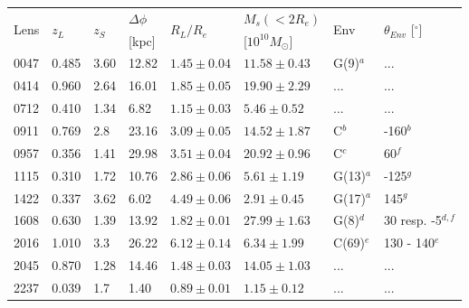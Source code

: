 \documentclass[useAMS,usenatbib]{mn2e}
\begin{document}
\begin{table}
  \begin{center}
    \begin{tabular}{l l l l l l l l}
      \multirow{2}{*}{Lens} & \multirow{2}{*}{$z_{L}$} & \multirow{2}{*}{$z_{S}$} & $\Delta\phi$ & \multirow{2}{*}{$R_{L}/R_{e}$} & $M_s(<2R_e)$ & \multirow{2}{*}{Env} & \multirow{2}{*}{$\theta_{Env}$ [$^{\circ}$]} \\ 
       & & & [kpc] & & [$10^{10}M_{\odot}$] & & \\ \hline
      0047 & 0.485 & 3.60 & 12.82 & $1.45\pm0.04$ & $11.58\pm0.43$ & G(9)$^{a}$ & ... \\
      0414 & 0.960 & 2.64 & 16.01 & $1.85\pm0.05$ & $19.90\pm2.29$ & ... & ... \\
      0712 & 0.410 & 1.34 & 6.82  & $1.15\pm0.03$ & $5.46\pm0.52$ & ... & ... \\
      0911 & 0.769 & 2.8  & 23.16 & $3.09\pm0.05$ & $14.52\pm1.87$ & C$^{b}$ & -160$^{b}$ \\
      0957 & 0.356 & 1.41 & 29.98 & $3.51\pm0.04$ & $20.92\pm0.96$ & C$^{c}$ & 60$^{f}$ \\
      1115 & 0.310 & 1.72 & 10.76 & $2.86\pm0.06$ & $5.61\pm1.19$ & G(13)$^{a}$ & -125$^{g}$ \\
      1422 & 0.337 & 3.62 & 6.02  & $4.49\pm0.06$ & $2.91\pm0.45$ & G(17)$^{a}$ & 145$^{g}$ \\
      1608 & 0.630 & 1.39 & 13.92 & $1.82\pm0.01$ & $27.99\pm1.63$ & G(8)$^{d}$ & 30 resp. -5$^{d,f}$\\
      2016 & 1.010 & 3.3  & 26.22 & $6.12\pm0.14$ & $6.34\pm1.99$ & C(69)$^{e}$ & 130 - 140$^{e}$ \\
      2045 & 0.870 & 1.28 & 14.46 & $1.48\pm0.03$ & $14.05\pm1.03$ & ... & ... \\
      2237 & 0.039 & 1.7  & 1.40  & $0.89\pm0.01$ & $1.15\pm0.12$ & ... & ... \\
    \end{tabular}

\end{center}
\end{table}
\end{document}
